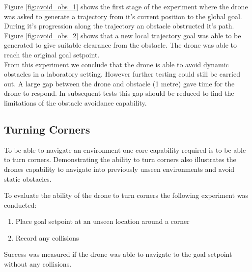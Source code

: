 \documentclass[capstone_report.tex]{subfiles}
\begin{document}
Figure \ref{fig:avoid_obs_1} shows the first stage of the experiment where the drone was asked to generate a trajectory from it's current position to the global goal.  During it's progression along the trajectory an obstacle obstructed it's path.   Figure \ref{fig:avoid_obs_2} shows that a new local trajectory goal was able to be generated to give suitable clearance from the obstacle.  The drone was able to reach the original goal setpoint.\\

From this experiment we conclude that the drone is able to avoid dynamic obstacles in a laboratory setting.  However further testing could still be carried out.  A large gap between the drone and obstacle (1 metre) gave time for the drone to respond.  In subsequent tests this gap should be reduced to find the limitations of the obstacle avoidance capability.

\subsection{Turning Corners}
To be able to navigate an environment one core capability required is to be able to turn corners.  Demonstrating the ability to turn corners also illustrates the drones capability to navigate into previously unseen environments and avoid static obstacles.

To evaluate the ability of the drone to turn corners the following experiment was conducted:
\begin{enumerate}
    \item Place goal setpoint at an unseen location around a corner
    \item Record any collisions 
\end{enumerate}
Success was measured if the drone was able to navigate to the goal setpoint without any collisions.
\end{document}

